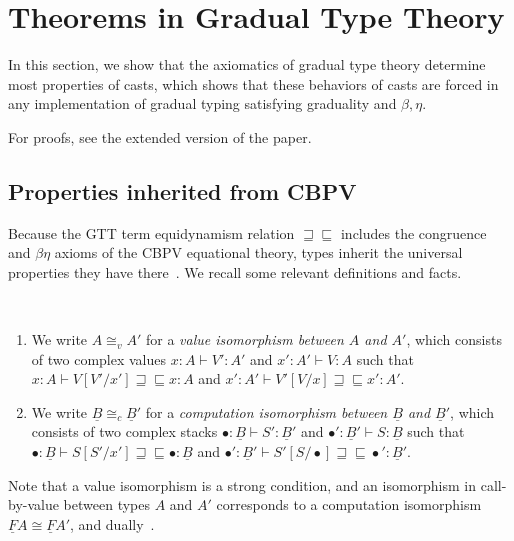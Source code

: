 \documentclass[acmsmall,nonacm]{acmart}
\renewcommand{\u}{\underline}
\newcommand{\ltdyn}{\sqsubseteq}
\newcommand{\gtdyn}{\sqsupseteq}
\newcommand{\equidyn}{\mathrel{\gtdyn\ltdyn}}
\begin{document}
\section{Theorems in Gradual Type Theory}
\label{sec:theorems-in-gtt}

In this section, we show that the axiomatics of gradual type theory
determine most properties of casts, which shows that these behaviors of
casts are forced in any implementation of gradual typing satisfying
graduality and $\beta,\eta$.
\begin{shortonly}
  For proofs, see the extended version of the paper.
\end{shortonly}
  
\begin{longonly}
\subsection{Properties inherited from CBPV}

Because the GTT term equidynamism relation $\equidyn$ includes the
congruence and $\beta\eta$ axioms of the CBPV equational theory, types
inherit the universal properties they have there~\cite{levy03cbpvbook}.  We recall
some relevant definitions and facts.

\begin{definition}[Isomorphism] ~
  \begin{enumerate}
  \item We write $A \cong_v A'$ for a \emph{value isomorphism between
    $A$ and $A'$}, which consists of two complex values $x : A \vdash V'
    : A'$ and $x' : A' \vdash V : A$ such that $x : A \vdash V[V'/x']
    \equidyn x : A$ and $x' : A' \vdash V'[V/x] \equidyn x' : A'$.
  \item We write $\u B \cong_c \u B'$ for a \emph{computation
    isomorphism between $\u B$ and $\u B'$}, which consists of two
    complex stacks $\bullet : \u B \vdash S' : \u B'$ and $\bullet' : \u
    B' \vdash S : \u B$ such that $\bullet : \u B \vdash S[S'/x']
    \equidyn \bullet : \u B$ and $\bullet' : \u B' \vdash S'[S/\bullet]
    \equidyn \bullet' : \u B'$.
  \end{enumerate}
\end{definition}
Note that a value isomorphism is a strong condition, and an isomorphism
in call-by-value between types $A$ and $A'$ corresponds to a computation
isomorphism $\u F A \cong \u F A'$, and dually~\cite{levy17popl}.

\smallskip


\end{longonly}
\end{document}
